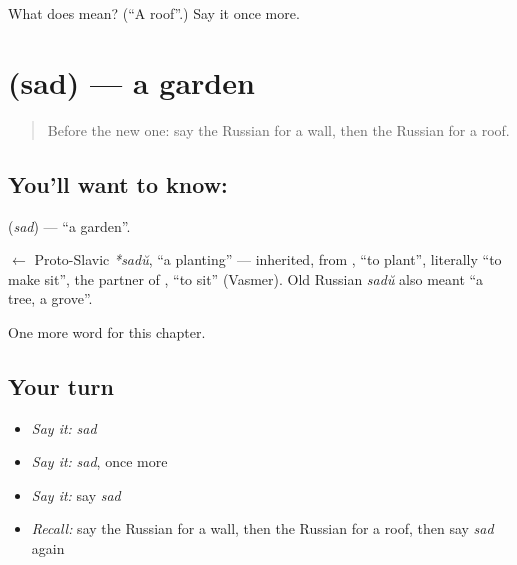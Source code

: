 \begin{tcolorbox}[breakable,colback=teal!4,colframe=teal!35!black,title={Before you move on}]
What does  mean? (\textquotedblleft{}A roof\textquotedblright{}.) Say it once more.
\end{tcolorbox}
\section[\texorpdfstring{\ru{сад} (sad)}{сад (sad)}]{ (sad) — a garden}

\label{lesson:RU-C50-garden}



\begin{quote}
Before the new one: say the Russian for a wall, then the Russian for a roof.
\end{quote}

\subsection*{You'll want to know: }
\textbf{} (\emph{sad}) — \textquotedblleft{}a garden\textquotedblright{}.

\begin{cousinweb}
\textbf{} $\leftarrow$ Proto-Slavic \emph{*sadŭ}, \textquotedblleft{}a planting\textquotedblright{} — inherited, from \emph{}, \textquotedblleft{}to plant\textquotedblright{}, literally \textquotedblleft{}to make sit\textquotedblright{}, the partner of \emph{}, \textquotedblleft{}to sit\textquotedblright{} (Vasmer). Old Russian \emph{sadŭ} also meant \textquotedblleft{}a tree, a grove\textquotedblright{}.
\end{cousinweb}

\begin{grammarlens}[title={What you've built}]
One more word for this chapter.
\end{grammarlens}

\subsection*{Your turn}
\begin{itemize}
\raggedright
  \item \emph{Say it:} \emph{sad}
  \item \emph{Say it:} \emph{sad}, once more
  \item \emph{Say it:} say \emph{sad}
  \item \emph{Recall:} say the Russian for a wall, then the Russian for a roof, then say \emph{sad} again
\end{itemize}

